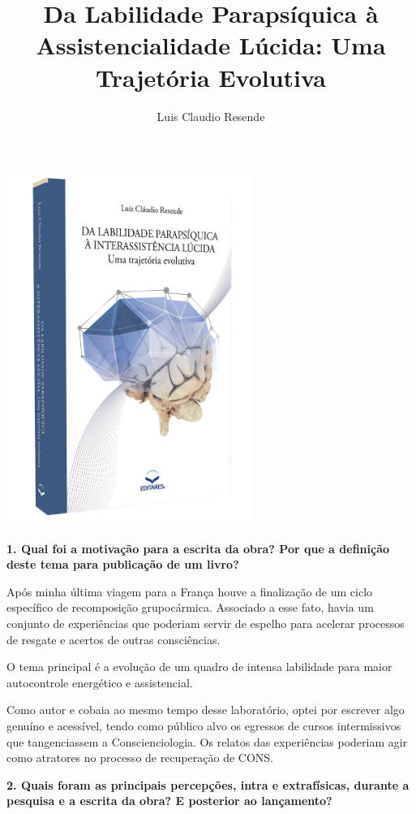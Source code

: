 \documentclass{gescons}
\author{Luis Claudio Resende}
\title{Da Labilidade Parapsíquica à Assistencialidade Lúcida: Uma Trajetória Evolutiva}
\begin{document}
    \makeentrevistatitle

    \begin{multicols}{2}


\begin{center}
    \includegraphics[width=8cm]{articles/entrevista/mockups/Luis_Claudio_Resende-Labilidade.png}
\end{center}

\textbf{1. Qual foi a motivação para a escrita da obra? Por que a definição deste tema para publicação de um livro? }

Após minha última viagem para a França houve a finalização de um ciclo específico de recomposição grupocármica.  Associado a esse fato, havia um conjunto de experiências que poderiam servir de espelho para acelerar processos de resgate e acertos de outras consciências.

O tema principal é a evolução de um quadro de intensa labilidade para maior autocontrole energético e assistencial. 

Como autor e cobaia ao mesmo tempo desse laboratório, optei por escrever algo genuíno e acessível, tendo como público alvo os egressos de cursos intermissivos que tangenciassem a Conscienciologia.  Os relatos das experiências poderiam agir como atratores no processo de recuperação de CONS.

\textbf{2.       Quais foram as principais percepções, intra e extrafísicas, durante a pesquisa e a escrita da obra? E posterior ao lançamento?}


\end{multicols}
\end{document}
